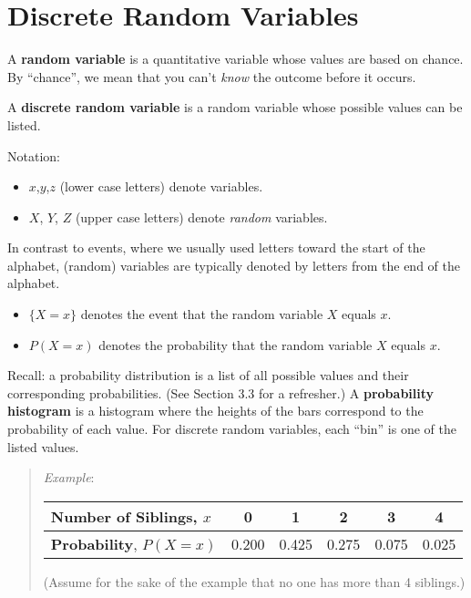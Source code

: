 \documentclass[
]{book}
\providecommand{\tightlist}{%
  \setlength{\itemsep}{0pt}\setlength{\parskip}{0pt}}
\begin{document}
\hypertarget{discrete-random-variables}{%
\section{Discrete Random Variables}\label{discrete-random-variables}}

A \textbf{random variable} is a quantitative variable whose values are based on chance. By ``chance'', we mean that you can't \emph{know} the outcome before it occurs.

A \textbf{discrete random variable} is a random variable whose possible values can be listed.

Notation:

\begin{itemize}
\tightlist
\item
  \(x\),\(y\),\(z\) (lower case letters) denote variables.
\item
  \(X\), \(Y\), \(Z\) (upper case letters) denote \emph{random} variables.
\end{itemize}

In contrast to events, where we usually used letters toward the start of the alphabet, (random) variables are typically denoted by letters from the end of the alphabet.

\begin{itemize}
\tightlist
\item
  \(\{X=x\}\) denotes the event that the random variable \(X\) equals \(x\).
\item
  \(P(X=x)\) denotes the probability that the random variable \(X\) equals \(x\).
\end{itemize}

Recall: a probability distribution is a list of all possible values and their corresponding probabilities. (See Section 3.3 for a refresher.) A \textbf{probability histogram} is a histogram where the heights of the bars correspond to the probability of each value. For discrete random variables, each ``bin'' is one of the listed values.

\begin{quote}
\emph{Example}:

\begin{longtable}[]{@{}lccccc@{}}
\toprule
Number of Siblings, \(x\) & 0 & 1 & 2 & 3 & 4 \\
\midrule
\endhead
\textbf{Probability}, \(P(X=x)\) & 0.200 & 0.425 & 0.275 & 0.075 & 0.025 \\
\bottomrule
\end{longtable}

(Assume for the sake of the example that no one has more than 4 siblings.)
\end{quote}
\end{document}
